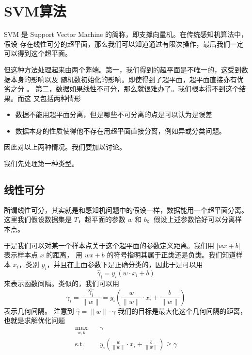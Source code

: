 \section{SVM算法}

SVM 是 Support Vector Machine 的简称，即支撑向量机。在传统感知机算法中，假设
存在线性可分的超平面，那么我们可以知道通过有限次操作，最后我们一定可以得到这个超平面。

但这种方法处理起来由两个弊端。第一，我们得到的超平面是不唯一的，这受到数据本身的影响以及
随机数初始化的影响。即使得到了超平面，超平面直接亦有优劣之分 。
第二，数据如果线性不可分，那么就很难办了。我们根本得不到这个结果。而这
又包括两种情形
\begin{itemize}
\item 数据不能用超平面分离，但是哪些不可分离的点是可以认为是误差
\item 数据本身的性质使得他不存在用超平面直接分离，例如异或分类问题。
\end{itemize}

因此对以上两种情况。我们要加以讨论。

我们先处理第一种类型。

\subsection{线性可分}

所谓线性可分，其实就是和感知机问题中的假设一样，数据能用一个超平面分离。
这里我们假设数据集是 $T$，超平面的参数 $w$ 和 $b$。假设上述参数恰好可以分离样本点。

于是我们可以对某一个样本点关于这个超平面的参数定义距离。我们用 $|wx+b|$ 表示样本点 $x$ 的距离，
用 $wx+b$ 的符号指明其属于正类还是负类。我们知道样本 $x_i$，类别 $y_i$，并且在上面参数下是正确分类的，因此于是可以用 
\begin{equation}
\hat{\gamma}_i = y_i(w\cdot x_i+b)
\end{equation}
来表示函数间隔。类似的，我们可以用
\begin{equation}
\gamma_i=\frac{\hat{\gamma_i}}{\|w\|}=y_i \left(\frac{w}{\|w\|}\cdot x_i + \frac{b}{\|w\|}\right)
\end{equation}
表示几何间隔。
注意到 $\hat\gamma = \|w\|\cdot \gamma$
我们的目标是最大化这个几何间隔的距离，也就是求解优化问题
\begin{equation}
\begin{aligned}
\max_{w, b} \quad & \gamma \\
\text{s.t.} \quad & y_i \left(\frac{w}{\|w\|}\cdot x_i + \frac{b}{\|w\|}\right) \geqslant \gamma
\end{aligned}
\end{equation}

